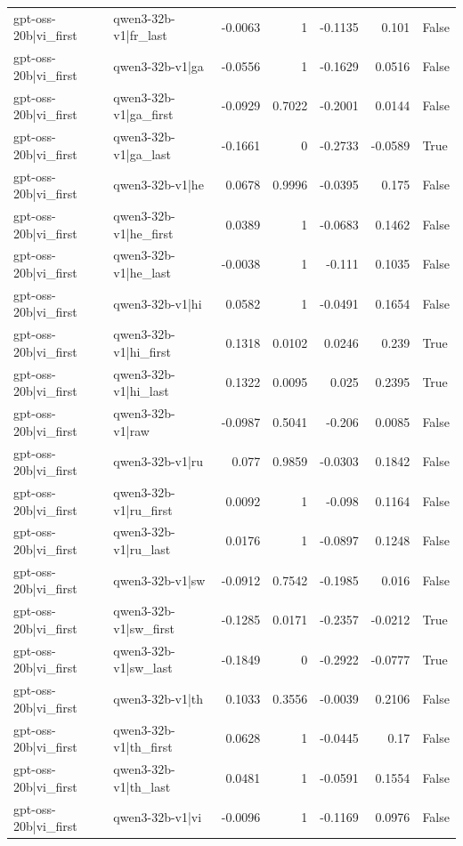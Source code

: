 \begin{table}
\begin{tabular}{l l r r r r l}
gpt-oss-20b|vi_first & qwen3-32b-v1|fr_last & -0.0063 & 1 & -0.1135 & 0.101 & False \\
gpt-oss-20b|vi_first & qwen3-32b-v1|ga & -0.0556 & 1 & -0.1629 & 0.0516 & False \\
gpt-oss-20b|vi_first & qwen3-32b-v1|ga_first & -0.0929 & 0.7022 & -0.2001 & 0.0144 & False \\
gpt-oss-20b|vi_first & qwen3-32b-v1|ga_last & -0.1661 & 0 & -0.2733 & -0.0589 & True \\
gpt-oss-20b|vi_first & qwen3-32b-v1|he & 0.0678 & 0.9996 & -0.0395 & 0.175 & False \\
gpt-oss-20b|vi_first & qwen3-32b-v1|he_first & 0.0389 & 1 & -0.0683 & 0.1462 & False \\
gpt-oss-20b|vi_first & qwen3-32b-v1|he_last & -0.0038 & 1 & -0.111 & 0.1035 & False \\
gpt-oss-20b|vi_first & qwen3-32b-v1|hi & 0.0582 & 1 & -0.0491 & 0.1654 & False \\
gpt-oss-20b|vi_first & qwen3-32b-v1|hi_first & 0.1318 & 0.0102 & 0.0246 & 0.239 & True \\
gpt-oss-20b|vi_first & qwen3-32b-v1|hi_last & 0.1322 & 0.0095 & 0.025 & 0.2395 & True \\
gpt-oss-20b|vi_first & qwen3-32b-v1|raw & -0.0987 & 0.5041 & -0.206 & 0.0085 & False \\
gpt-oss-20b|vi_first & qwen3-32b-v1|ru & 0.077 & 0.9859 & -0.0303 & 0.1842 & False \\
gpt-oss-20b|vi_first & qwen3-32b-v1|ru_first & 0.0092 & 1 & -0.098 & 0.1164 & False \\
gpt-oss-20b|vi_first & qwen3-32b-v1|ru_last & 0.0176 & 1 & -0.0897 & 0.1248 & False \\
gpt-oss-20b|vi_first & qwen3-32b-v1|sw & -0.0912 & 0.7542 & -0.1985 & 0.016 & False \\
gpt-oss-20b|vi_first & qwen3-32b-v1|sw_first & -0.1285 & 0.0171 & -0.2357 & -0.0212 & True \\
gpt-oss-20b|vi_first & qwen3-32b-v1|sw_last & -0.1849 & 0 & -0.2922 & -0.0777 & True \\
gpt-oss-20b|vi_first & qwen3-32b-v1|th & 0.1033 & 0.3556 & -0.0039 & 0.2106 & False \\
gpt-oss-20b|vi_first & qwen3-32b-v1|th_first & 0.0628 & 1 & -0.0445 & 0.17 & False \\
gpt-oss-20b|vi_first & qwen3-32b-v1|th_last & 0.0481 & 1 & -0.0591 & 0.1554 & False \\
gpt-oss-20b|vi_first & qwen3-32b-v1|vi & -0.0096 & 1 & -0.1169 & 0.0976 & False \\

\end{tabular}
\end{table}
